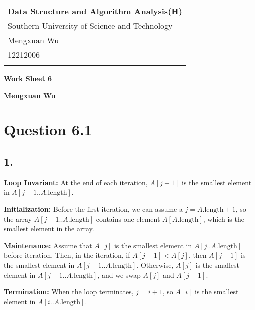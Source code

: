 \documentclass[a4paper,12pt]{article}
\begin{document}
\thispagestyle{empty} %

\begin{tabular}{p{15.5cm}}
{\large \bf Data Structure and Algorithm Analysis(H)} \\
Southern University of Science and Technology \\ Mengxuan Wu \\ 12212006 \\
\hline
\\
\end{tabular}

\vspace*{0.3cm} %

\begin{center}
	{\Large \bf Work Sheet 6}
	\vspace{2mm}

	{\bf Mengxuan Wu}
		
\end{center}  

\vspace{0.4cm}

\section*{Question 6.1}

\subsection*{1.}

\textbf{Loop Invariant:} At the end of each iteration, $A[j-1]$ is the smallest element in $A[j-1..A.\text{length}]$.

\textbf{Initialization:} Before the first iteration, we can assume a $j = A.\text{length} + 1$, so the array $A[j-1..A.\text{length}]$ contains one element $A[A.\text{length}]$, which is the smallest element in the array. 

\textbf{Maintenance:} Assume that $A[j]$ is the smallest element in $A[j..A.\text{length}]$ before iteration.
Then, in the iteration, if $A[j-1] < A[j]$, then $A[j-1]$ is the smallest element in $A[j-1..A.\text{length}]$.
Otherwise, $A[j]$ is the smallest element in $A[j-1..A.\text{length}]$, and we swap $A[j]$ and $A[j-1]$.

\textbf{Termination:} When the loop terminates, $j = i + 1$, so $A[i]$ is the smallest element in $A[i..A.\text{length}]$.
\end{document}
